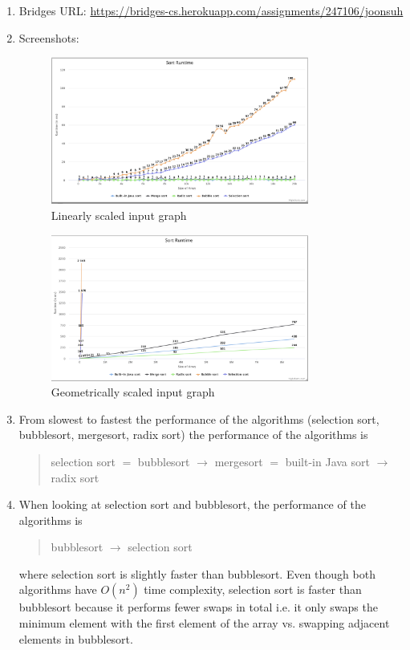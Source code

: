 \documentclass[../main.tex]{subfiles}
\begin{document}
\begin{enumerate}
    \item Bridges URL: \href{https://bridges-cs.herokuapp.com/assignments/247106/joonsuh}{https://bridges-cs.herokuapp.com/assignments/247106/joonsuh}
    \item Screenshots:
    \begin{figure}[ht]
        \centering
        \includegraphics[width=0.8\textwidth]{l3_4a.png}
        \caption{Linearly scaled input graph}
        \label{fig:merge_sort}
    \end{figure}
    \begin{figure}[ht]
        \centering
        \includegraphics[width=0.8\textwidth]{l3_4b.png}
        \caption{Geometrically scaled input graph}
        \label{fig:merge_sort}
    \end{figure}

    \newpage
    \item From slowest to fastest the performance of the algorithms
    (selection sort, bubblesort, mergesort, radix sort) the performance of the algorithms is
    \begin{quote}
        selection sort $=$ bubblesort $\to$ mergesort $=$ built-in Java sort $\to$ radix sort
    \end{quote}

    \item When looking at selection sort and bubblesort, the performance of the algorithms is
    \begin{quote}
        bubblesort $\to$ selection sort
    \end{quote}
    where selection sort is slightly faster than bubblesort. Even though both algorithms have 
    $O(n^2)$ time complexity, selection sort is faster than bubblesort because it performs fewer
    swaps in total i.e. it only swaps the minimum element with the first element of the array vs.
    swapping adjacent elements in bubblesort.

\end{enumerate}
\end{document}
